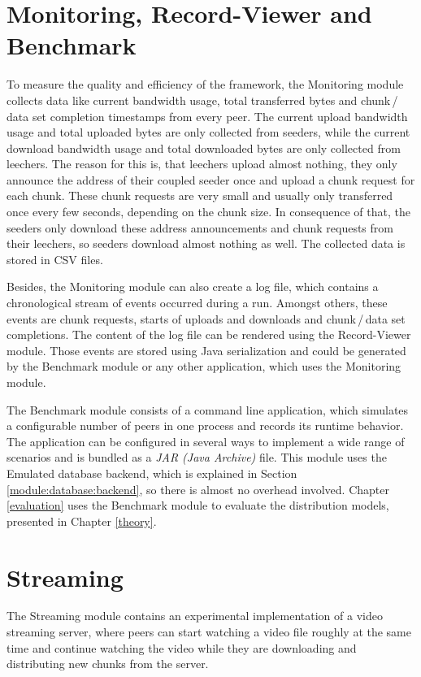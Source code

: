 \section{Monitoring, Record-Viewer and Benchmark}
\label{module:monitoring}

To measure the quality and efficiency of the framework, the Monitoring module collects data like current bandwidth usage, total transferred bytes and chunk\,/\,data set completion timestamps from every peer. The current upload bandwidth usage and total uploaded bytes are only collected from seeders, while the current download bandwidth usage and total downloaded bytes are only collected from leechers. The reason for this is, that leechers upload almost nothing, they only announce the address of their coupled seeder once and upload a chunk request for each chunk. These chunk requests are very small and usually only transferred once every few seconds, depending on the chunk size. In consequence of that, the seeders only download these address announcements and chunk requests from their leechers, so seeders download almost nothing as well. The collected data is stored in CSV files.

Besides, the Monitoring module can also create a log file, which contains a chronological stream of events occurred during a run. Amongst others, these events are chunk requests, starts of uploads and downloads and chunk\,/\,data set completions. The content of the log file can be rendered using the Record-Viewer module. Those events are stored using Java serialization and could be generated by the Benchmark module or any other application, which uses the Monitoring module.

The Benchmark module consists of a command line application, which simulates a configurable number of peers in one process and records its runtime behavior. The application can be configured in several ways to implement a wide range of scenarios and is bundled as a \emph{JAR (Java Archive)} file. This module uses the Emulated database backend, which is explained in Section \ref{module:database:backend}, so there is almost no overhead involved. Chapter \ref{evaluation} uses the Benchmark module to evaluate the distribution models, presented in Chapter \ref{theory}.


\section{Streaming}
\label{module:streaming}

The Streaming module contains an experimental implementation of a video streaming server, where peers can start watching a video file roughly at the same time and continue watching the video while they are downloading and distributing new chunks from the server. 

